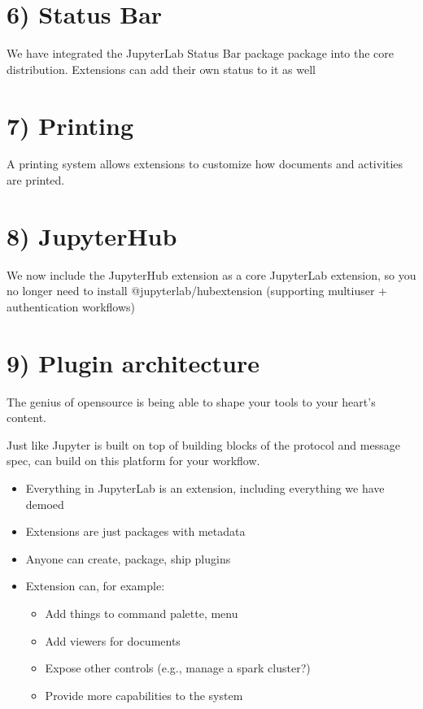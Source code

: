 \documentclass[letterpaper,10pt,english]{sphinxmanual}
\begin{document}
\section{6) Status Bar}
\label{\detokenize{markdown:status-bar}}
We have integrated the JupyterLab Status Bar package package into the core distribution. Extensions can add their own status to it as well


\section{7) Printing}
\label{\detokenize{markdown:printing}}
A printing system allows extensions to customize how documents and activities are printed.


\section{8) JupyterHub}
\label{\detokenize{markdown:jupyterhub}}
We now include the JupyterHub extension as a core JupyterLab extension, so you no longer need to install @jupyterlab/hub\sphinxhyphen{}extension (supporting multi\sphinxhyphen{}user + authentication workflows)


\section{9) Plugin architecture}
\label{\detokenize{markdown:plugin-architecture}}
The genius of open\sphinxhyphen{}source is being able to shape your tools to your heart’s content.

Just like Jupyter is built on top of building blocks of the protocol and message spec,  can build on this platform for your workflow.
\begin{itemize}
\item {} 
Everything in JupyterLab is an extension, including everything we have demoed

\item {} 
Extensions are just  packages with metadata

\item {} 
Anyone can create, package, ship plugins

\item {} 
Extension can, for example:
\begin{itemize}
\item {} 
Add things to command palette, menu

\item {} 
Add viewers for documents

\item {} 
Expose other controls (e.g., manage a spark cluster?)

\item {} 
Provide more capabilities to the system

\end{itemize}

\end{itemize}
\end{document}
